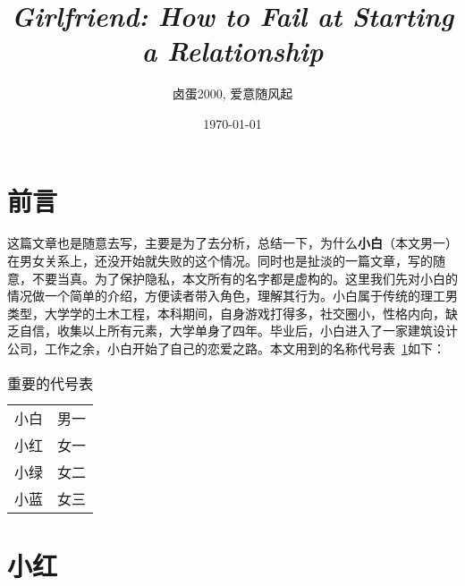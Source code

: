 \documentclass{article}
\title{\textit{Girlfriend: How to Fail at Starting a Relationship}}
\author{卤蛋2000, 爱意随风起}
\date{\today}
\begin{document}
\maketitle

\section{前言}
这篇文章也是随意去写，主要是为了去分析，总结一下，为什么\textbf{小白}（本文男一）在男女关系上，还没开始就失败的这个情况。同时也是扯淡的一篇文章，写的随意，不要当真。为了保护隐私，本文所有的名字都是虚构的。这里我们先对小白的情况做一个简单的介绍，方便读者带入角色，理解其行为。小白属于传统的理工男类型，大学学的土木工程，本科期间，自身游戏打得多，社交圈小，性格内向，缺乏自信，收集以上所有元素，大学单身了四年。毕业后，小白进入了一家建筑设计公司，工作之余，小白开始了自己的恋爱之路。本文用到的名称代号表~\ref{name_replace}如下：

\begin{table}[h]
    \caption{重要的代号表}
    \label{name_replace}
\centering

\begin{tabular}{ll}
\toprule
小白 & 男一 \\
小红 & 女一 \\
小绿 & 女二 \\
小蓝 & 女三 \\
\bottomrule
\end{tabular}

\end{table}

\section{小红}
\end{document}
